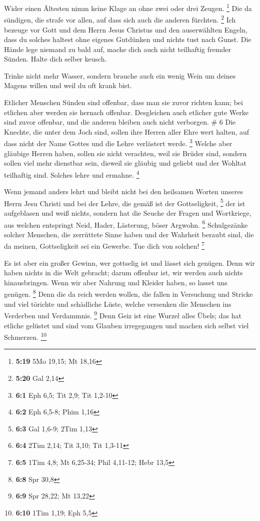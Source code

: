  Wider einen Ältesten nimm keine Klage an ohne zwei oder
drei Zeugen. \footnote{\textbf{5:19} 5Mo 19,15; Mt 18,16} 
Die da sündigen, die strafe vor allen, auf dass sich auch die anderen
fürchten. \footnote{\textbf{5:20} Gal 2,14}  Ich bezeuge
vor Gott und dem Herrn Jesus Christus und den auserwählten Engeln, dass
du solches haltest ohne eigenes Gutdünken und nichts tust nach Gunst.
 Die Hände lege niemand zu bald auf, mache dich auch nicht
teilhaftig fremder Sünden. Halte dich selber keusch.

 Trinke nicht mehr Wasser, sondern brauche auch ein wenig
Wein um deines Magens willen und weil du oft krank bist.

 Etlicher Menschen Sünden sind offenbar, dass man sie zuvor
richten kann; bei etlichen aber werden sie hernach offenbar.
 Desgleichen auch etlicher gute Werke sind zuvor offenbar,
und die anderen bleiben auch nicht verborgen. \# 6  Die
Knechte, die unter dem Joch sind, sollen ihre Herren aller Ehre wert
halten, auf dass nicht der Name Gottes und die Lehre verlästert werde.
\footnote{\textbf{6:1} Eph 6,5; Tit 2,9; Tit 1,2-10}  Welche
aber gläubige Herren haben, sollen sie nicht verachten, weil sie Brüder
sind, sondern sollen viel mehr dienstbar sein, dieweil sie gläubig und
geliebt und der Wohltat teilhaftig sind. Solches lehre und ermahne.
\footnote{\textbf{6:2} Eph 6,5-8; Phim 1,16}

 Wenn jemand anders lehrt und bleibt nicht bei den heilsamen
Worten unseres Herrn Jesu Christi und bei der Lehre, die gemäß ist der
Gottseligkeit, \footnote{\textbf{6:3} Gal 1,6-9; 2Tim 1,13} 
der ist aufgeblasen und weiß nichts, sondern hat die Seuche der Fragen
und Wortkriege, aus welchen entspringt Neid, Hader, Lästerung, böser
Argwohn. \footnote{\textbf{6:4} 2Tim 2,14; Tit 3,10; Tit 1,3-11}
 Schulgezänke solcher Menschen, die zerrüttete Sinne haben
und der Wahrheit beraubt sind, die da meinen, Gottseligkeit sei ein
Gewerbe. Tue dich von solchen! \footnote{\textbf{6:5} 1Tim 4,8; Mt
  6,25-34; Phil 4,11-12; Hebr 13,5}

 Es ist aber ein großer Gewinn, wer gottselig ist und lässet
sich genügen.  Denn wir haben nichts in die Welt gebracht;
darum offenbar ist, wir werden auch nichts hinausbringen. 
Wenn wir aber Nahrung und Kleider haben, so lasset uns genügen.
\footnote{\textbf{6:8} Spr 30,8}  Denn die da reich werden
wollen, die fallen in Versuchung und Stricke und viel törichte und
schädliche Lüste, welche versenken die Menschen ins Verderben und
Verdammnis. \footnote{\textbf{6:9} Spr 28,22; Mt 13,22} 
Denn Geiz ist eine Wurzel alles Übels; das hat etliche gelüstet und sind
vom Glauben irregegangen und machen sich selbst viel Schmerzen.
\footnote{\textbf{6:10} 1Tim 1,19; Eph 5,5}

